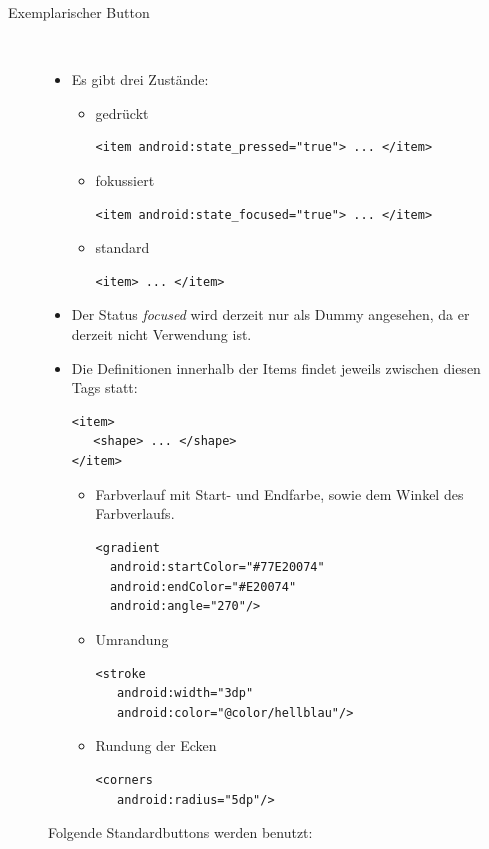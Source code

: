 \begin{description}
\item[Exemplarischer Button]~\par
\begin{itemize}
\item Es gibt drei Zustände:
\begin{itemize}
\item gedrückt
\begin{lstlisting}
<item android:state_pressed="true"> ... </item>
\end{lstlisting}
\item fokussiert
\begin{lstlisting}
<item android:state_focused="true"> ... </item>
\end{lstlisting}
\item standard
\begin{lstlisting}
<item> ... </item>
\end{lstlisting}
\end{itemize}
\item Der Status \textit{focused} wird derzeit nur als Dummy angesehen, da er derzeit nicht Verwendung ist.
\item Die Definitionen innerhalb der Items findet jeweils zwischen diesen Tags statt:
\begin{lstlisting}
<item>
   <shape> ... </shape>
</item>
\end{lstlisting}
\begin{itemize}
\item Farbverlauf mit Start- und Endfarbe, sowie dem Winkel des Farbverlaufs.
\begin{lstlisting}
<gradient
  android:startColor="#77E20074" 
  android:endColor="#E20074"     
  android:angle="270"/>           
\end{lstlisting}
\item Umrandung
\begin{lstlisting}
<stroke
   android:width="3dp"
   android:color="@color/hellblau"/>
\end{lstlisting}
\item Rundung der Ecken
\begin{lstlisting}
<corners
   android:radius="5dp"/>
\end{lstlisting}
\end{itemize}
\end{itemize}

Folgende Standardbuttons werden benutzt:


\end{description}
